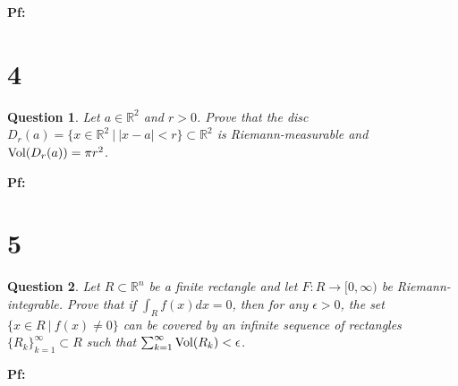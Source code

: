 \documentclass{article}
\newtheorem{question}{Question}
\begin{document}
\textbf{Pf:}

\break

\section*{4}
\begin{myBox}[]{}
    \begin{question}
        Let $a\in\mathbb{R}^2$ and $r>0$. Prove that the disc $D_r(a)=\{x\in\mathbb{R}^2\ |\ |x-a|<r\}\subset\mathbb{R}^2$ is Riemann-measurable and $\textmd{Vol}(D_r(a))=\pi r^2$.
    \end{question}
\end{myBox}

\textbf{Pf:}

\break

\section*{5}
\begin{myBox}[]{}
    \begin{question}
        Let $R\subset\mathbb{R}^n$ be a finite rectangle and let $F:R\rightarrow[0,\infty)$ be Riemann-integrable. Prove that if $\int_Rf(x)dx = 0$, then for any $\epsilon>0$, the set $\{x\in R\ |\ f(x)\neq 0\}$ can be covered by an infinite sequence of rectangles $\{R_k\}_{k=1}^{\infty}\subset R$ such that $\sum_{k=1}^{\infty}\textmd{Vol}(R_k)<\epsilon$.
    \end{question}
\end{myBox}

\textbf{Pf:}
\end{document}
